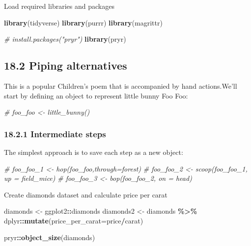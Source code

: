 \documentclass[
]{article}
\newenvironment{Shaded}{\begin{snugshade}}{\end{snugshade}}
\newcommand{\AttributeTok}[1]{\textcolor[rgb]{0.13,0.29,0.53}{#1}}
\newcommand{\CommentTok}[1]{\textcolor[rgb]{0.56,0.35,0.01}{\textit{#1}}}
\newcommand{\FunctionTok}[1]{\textcolor[rgb]{0.13,0.29,0.53}{\textbf{#1}}}
\newcommand{\NormalTok}[1]{#1}
\newcommand{\OtherTok}[1]{\textcolor[rgb]{0.56,0.35,0.01}{#1}}
\newcommand{\SpecialCharTok}[1]{\textcolor[rgb]{0.81,0.36,0.00}{\textbf{#1}}}
\begin{document}
Load required libraries and packages

\begin{Shaded}
\begin{Highlighting}[]
\FunctionTok{library}\NormalTok{(tidyverse)}
\FunctionTok{library}\NormalTok{(purrr)}
\FunctionTok{library}\NormalTok{(magrittr)}

\CommentTok{\# install.packages("pryr")}
\FunctionTok{library}\NormalTok{(pryr)}
\end{Highlighting}
\end{Shaded}

\hypertarget{piping-alternatives}{%
\subsection{18.2 Piping alternatives}\label{piping-alternatives}}

This is a popular Children's poem that is accompanied by hand
actions.We'll start by defining an object to represent little bunny Foo
Foo:

\begin{Shaded}
\begin{Highlighting}[]
\CommentTok{\# foo\_foo \textless{}{-} little\_bunny()}
\end{Highlighting}
\end{Shaded}

\hypertarget{intermediate-steps}{%
\subsubsection{18.2.1 Intermediate steps}\label{intermediate-steps}}

The simplest approach is to save each step as a new object:

\begin{Shaded}
\begin{Highlighting}[]
\CommentTok{\# foo\_foo\_1 \textless{}{-} hop(foo\_foo,through=forest)}
\CommentTok{\# foo\_foo\_2 \textless{}{-} scoop(foo\_foo\_1, up = field\_mice)}
\CommentTok{\# foo\_foo\_3 \textless{}{-} bop(foo\_foo\_2, on = head)}
\end{Highlighting}
\end{Shaded}

Create diamonds dataset and calculate price per carat

\begin{Shaded}
\begin{Highlighting}[]
\NormalTok{diamonds }\OtherTok{\textless{}{-}}\NormalTok{ ggplot2}\SpecialCharTok{::}\NormalTok{diamonds}
\NormalTok{diamonds2 }\OtherTok{\textless{}{-}}\NormalTok{ diamonds }\SpecialCharTok{\%\textgreater{}\%} 
\NormalTok{  dplyr}\SpecialCharTok{::}\FunctionTok{mutate}\NormalTok{(}\AttributeTok{price\_per\_carat=}\NormalTok{price}\SpecialCharTok{/}\NormalTok{carat)}

\NormalTok{pryr}\SpecialCharTok{::}\FunctionTok{object\_size}\NormalTok{(diamonds)}
\end{Highlighting}
\end{Shaded}
\end{document}
